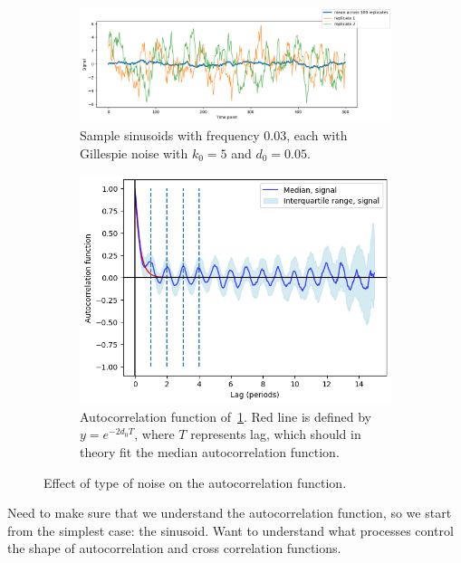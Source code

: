 \begin{figure}
  \begin{subfigure}[t]{0.45\textwidth}
  \centering
    \includegraphics[width=\linewidth]{gillespie_k5_d0p05_mean}
    \caption{
      Sample sinusoids with frequency 0.03, each with Gillespie noise with $k_{0} = 5$ and $d_{0} = 0.05$.
    }
    \label{fig:acf-sinusoids-gillnoise-ts}
  \end{subfigure}%
  \centering
  \begin{subfigure}[t]{0.45\textwidth}
  \centering
    \includegraphics[width=\linewidth]{gillespie_k5_d0p05_acf}
    \caption{
      Autocorrelation function of~\ref{fig:acf-sinusoids-gillnoise-ts}.
      Red line is defined by $y = e^{-2d_{0}T}$, where $T$ represents lag, which should in theory fit the median autocorrelation function.
    }
    \label{fig:acf-sinusoids-gillnoise-acf}
  \end{subfigure}

  \caption{
    Effect of type of noise on the autocorrelation function.
  }
  \label{fig:acf-sinusoids}
\end{figure}

Need to make sure that we understand the autocorrelation function, so we start from the simplest case: the sinusoid.
Want to understand what processes control the shape of autocorrelation and cross correlation functions.


